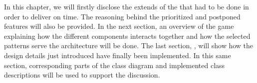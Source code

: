 
In this chapter, we will firstly disclose the extends of the  that had to be done in order to deliver on time. The reasoning behind the prioritized and postponed features will also be provided. In the next section, an overview of the game  explaining how the different components interacts together and how the selected patterns serve the architecture will be done. The last section, , will show how the design details just introduced have finally been implemented. In this same section, corresponding parts of the class diagram and implemented class descriptions will be used to support the discussion.




